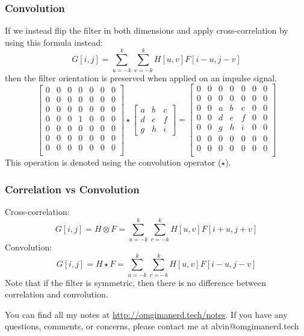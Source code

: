 \documentclass{math}
\begin{document}
\subsubsection*{Convolution}
If we instead flip the filter in both dimensions and apply cross-correlation
by using this formula instead:
\[ G[i,j] = \sum_{u=-k}^{k}\sum_{v=-k}^{k}H[u,v]F[i-u,j-v] \]
then the filter orientation is preserved when applied on an impulse signal.
\[ \begin{bmatrix}
  0 & 0 & 0 & 0 & 0 & 0 & 0 \\
  0 & 0 & 0 & 0 & 0 & 0 & 0 \\
  0 & 0 & 0 & 0 & 0 & 0 & 0 \\
  0 & 0 & 0 & 1 & 0 & 0 & 0 \\
  0 & 0 & 0 & 0 & 0 & 0 & 0 \\
  0 & 0 & 0 & 0 & 0 & 0 & 0 \\
  0 & 0 & 0 & 0 & 0 & 0 & 0 \\
\end{bmatrix}\star\begin{bmatrix}
  a & b & c \\
  d & e & f \\
  g & h & i
\end{bmatrix} = \begin{bmatrix}
  0 & 0 & 0 & 0 & 0 & 0 & 0 \\
  0 & 0 & 0 & 0 & 0 & 0 & 0 \\
  0 & 0 & a & b & c & 0 & 0 \\
  0 & 0 & d & e & f & 0 & 0 \\
  0 & 0 & g & h & i & 0 & 0 \\
  0 & 0 & 0 & 0 & 0 & 0 & 0 \\
  0 & 0 & 0 & 0 & 0 & 0 & 0 \\
\end{bmatrix} \]
This operation is denoted using the convolution operator (\( \star \)).

\subsubsection*{Correlation vs Convolution}
Cross-correlation:
\[ G[i,j] = H\otimes F = \sum_{u=-k}^{k}\sum_{v=-k}^{k}H[u,v]F[i+u,j+v] \]
Convolution:
\[ G[i,j] = H\star F = \sum_{u=-k}^{k}\sum_{v=-k}^{k}H[u,v]F[i-u,j-v] \]
Note that if the filter is symmetric, then there is no difference between
correlation and convolution.

\begin{center}
  You can find all my notes at \url{http://omgimanerd.tech/notes}. If you have
  any questions, comments, or concerns, please contact me at
  alvin@omgimanerd.tech
\end{center}
\end{document}
